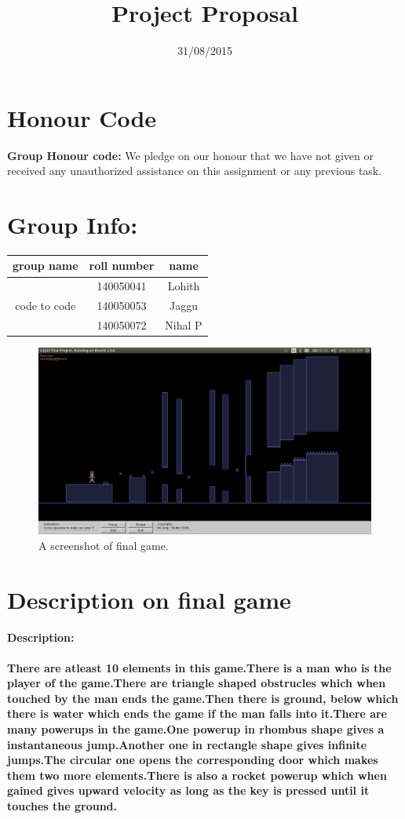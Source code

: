 \documentclass{article}
\title{Project Proposal}
\date{31/08/2015}
\begin{document}
\section{Honour Code}
{\bf Group Honour code:} We pledge on our honour that we have not given or received any unauthorized assistance on this assignment or any previous task.

\section{Group Info:}

\begin{tabular}{ |c|c|c| } 
 \hline
\vspace{0.5pt}
 group name & roll number & name \\ 
\hline
  & 140050041 & Lohith \\ 
\vspace{0.5pt}
 code to code & 140050053 & Jaggu \\
\vspace{0.5pt}
  & 140050072 & Nihal P \\ 
 \hline
\end{tabular}

\begin{figure}[h]
\includegraphics[width=6in]{Box2D}
\caption{A screenshot of final game.}
\label{fig:1}
\end{figure}
\section{Description on final game}
\paragraph{Description:}
{\bf There are atleast 10 elements in this game.There is a man who is the player of the game.There are triangle shaped obstrucles which when touched by the man ends the game.Then there is ground, below which there is water which ends the game if the man falls into it.There are many powerups in the game.One powerup in rhombus shape gives a instantaneous jump.Another one in rectangle shape gives infinite jumps.The circular one opens the corresponding door which makes them two more elements.There is also a rocket powerup which when gained gives upward velocity as long as the key is pressed until it touches the ground.}
\end{document}
